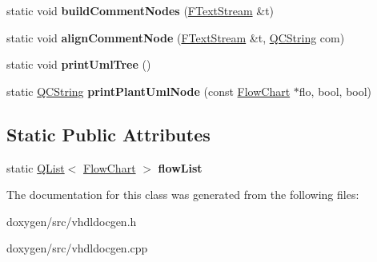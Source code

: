 \begin{DoxyCompactItemize}
\mbox{\label{class_flow_chart_ac9946d79e1bc63fe91324fe22c0d2fc1}} 
static void {\bfseries build\+Comment\+Nodes} (\mbox{\hyperlink{class_f_text_stream}{F\+Text\+Stream}} \&t)
\item 
\mbox{\label{class_flow_chart_a3a4b52a7183d50862628df4ecd70bf60}} 
static void {\bfseries align\+Comment\+Node} (\mbox{\hyperlink{class_f_text_stream}{F\+Text\+Stream}} \&t, \mbox{\hyperlink{class_q_c_string}{Q\+C\+String}} com)
\item 
\mbox{\label{class_flow_chart_acf7119e47c96291250aee1c5c98ac794}} 
static void {\bfseries print\+Uml\+Tree} ()
\item 
\mbox{\label{class_flow_chart_a32074e872c88dc70eb9930b6663bc5eb}} 
static \mbox{\hyperlink{class_q_c_string}{Q\+C\+String}} {\bfseries print\+Plant\+Uml\+Node} (const \mbox{\hyperlink{class_flow_chart}{Flow\+Chart}} $\ast$flo, bool, bool)
\end{DoxyCompactItemize}
\subsection*{Static Public Attributes}
\begin{DoxyCompactItemize}
\item 
\mbox{\label{class_flow_chart_a9acef436683828debe7218c734e22697}} 
static \mbox{\hyperlink{class_q_list}{Q\+List}}$<$ \mbox{\hyperlink{class_flow_chart}{Flow\+Chart}} $>$ {\bfseries flow\+List}
\end{DoxyCompactItemize}


The documentation for this class was generated from the following files\+:\begin{DoxyCompactItemize}
\item 
doxygen/src/vhdldocgen.\+h\item 
doxygen/src/vhdldocgen.\+cpp\end{DoxyCompactItemize}
